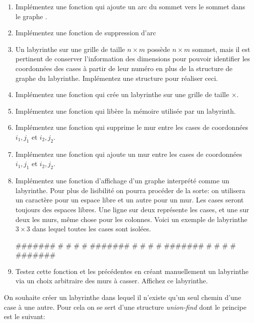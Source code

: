 \documentclass[a4paper, 10pt]{article}
\begin{document}
\begin{enumerate}[resume]
\item Implémentez une fonction  qui ajoute un arc du sommet  vers le sommet  dans le graphe .
\item Implémentez une fonction de suppression d'arc 
\item Un labyrinthe sur une grille de taille \(n\times m\) possède \(n\times m\) sommet, mais il est pertinent de conserver l'information des dimensions pour pouvoir identifier les coordonnées des cases à partir de leur numéro en plus de la structure de graphe du labyrinthe. Implémentez une structure  pour réaliser ceci.
\item Implémentez une fonction  qui crée un labyrinthe sur une grille de taille \(\times\).
\item Implémentez une fonction  qui libère la mémoire utilisée par un labyrinth.
\item Implémentez une fonction  qui supprime le mur entre les cases de coordonnées \(i_1, j_1\) et \(i_2,j_2\).
\item Implémentez une fonction  qui ajoute un mur entre les cases de coordonnées \(i_1, j_1\) et \(i_2,j_2\).
\item Implémentez une fonction d'affichage d'un graphe interprété comme un labyrinthe. Pour plus de lisibilité on pourra procéder de la sorte: on utilisera un caractère pour un espace libre et un autre pour un mur. Les cases seront toujours des espaces libres. Une ligne sur deux représente les cases, et une sur deux les murs, même chose pour les colonnes. Voici un exemple de labyrinthe \(3\times 3\) dans lequel toutes les cases sont isolées. %
\begin{ccode}
#######
# # # #
#######
# # # #
#######
# # # #
#######
\end{ccode}
\item Testez cette fonction et les précédentes en créant manuellement un labyrinthe via un choix arbitraire des murs à casser. Affichez ce labyrinthe.
\end{enumerate}
On souhaite créer un labyrinthe dans lequel il n'existe qu'un seul chemin d'une case à une autre. Pour cela on se sert d'une structure \emph{union-find} dont le principe est le suivant:
\end{document}
